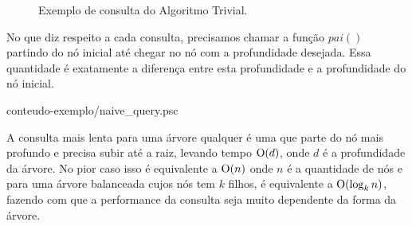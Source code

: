 \begin{figure}[h!]
  \hspace{0cm}
  \centering
  \caption{Exemplo de consulta do Algoritmo Trivial.}
\end{figure}


No que diz respeito a cada consulta, precisamos chamar a função $pai()$
partindo do nó inicial até chegar no nó com a profundidade desejada.
Essa quantidade é exatamente a diferença entre esta profundidade e a
profundidade do nó inicial.

\begin{program}[]
  
  {conteudo-exemplo/naive_query.psc}

  \caption{Consulta do Algoritmo Trivial.\label{prog:naivequery}}
\end{program}

A consulta mais lenta para uma árvore qualquer é uma que parte do nó mais profundo
e precisa subir até a raiz, levando tempo $\mathrm{O}(d)$, onde $d$ é a profundidade
da árvore. No pior caso isso é equivalente a $\mathrm{O}(n)$ onde $n$ é a quantidade
de nós e para uma árvore balanceada cujos nós tem $k$ filhos, é equivalente a
$\mathrm{O}(\log_k n)$, fazendo com que a performance da consulta seja muito dependente da
forma da árvore.

